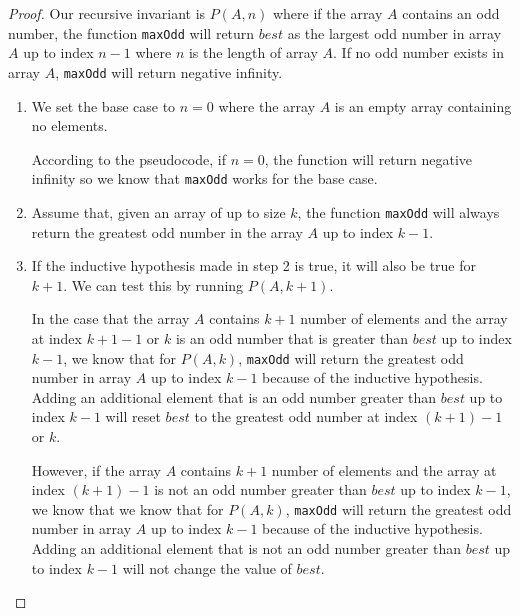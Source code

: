 \documentclass{article}
\begin{document}
    \begin{proof}

      Our recursive invariant is $P(A, n)$ where if the array $A$ contains 
      an odd number, the function \texttt{maxOdd} will return $best$ as the 
      largest odd number in array $A$ up to index $n-1$ where $n$ is the 
      length of array $A$. If no odd number exists in array $A$, \texttt{maxOdd}
      will return negative infinity.

      \begin{enumerate}
        \item We set the base case to $n=0$ where the array $A$ is an 
        empty array containing no elements.

        According to the pseudocode, if $n=0$, the function 
        will return negative infinity so we know that \texttt{maxOdd} works 
        for the base case.

        \item Assume that, given an array of up to size $k$, the function 
        \texttt{maxOdd} will always return the greatest odd number in the 
        array $A$ up to index $k-1$.
       
        \item If the inductive hypothesis made in step 2 is true, it will 
        also be true for $k+1$. We can test this by running $P(A, k+1)$.

        In the case that the array $A$ contains $k+1$ number of elements 
        and the array at index $k+1-1$ or $k$ is an odd number that is greater than 
        $best$ up to index $k-1$, we know that for $P(A, k)$, \texttt{maxOdd} will 
        return the greatest odd number in array $A$ up to index $k-1$ because of 
        the inductive hypothesis. Adding an additional element that is an odd number 
        greater than $best$ up to index $k-1$ will reset $best$ to the greatest odd 
        number at index $(k+1) - 1$ or $k$.

        However, if the array $A$ contains $k+1$ number of elements and the array at index 
        $(k+1)-1$ is not an odd number greater than $best$ up to index $k-1$, we know that
        we know that for $P(A, k)$, \texttt{maxOdd} will return the greatest odd number 
        in array $A$ up to index $k-1$ because of 
        the inductive hypothesis. Adding an additional element that is not an odd number 
        greater than $best$ up to index $k-1$ will not change the value of $best$.
        
        \end{enumerate}

    \end{proof}
    
    
\end{document}
